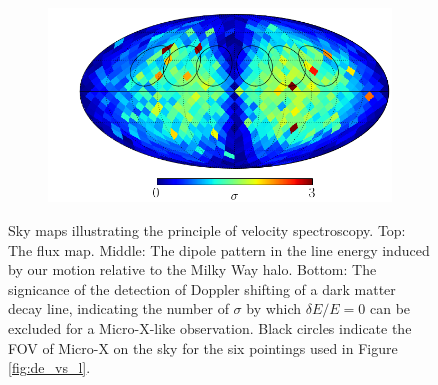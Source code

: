 \documentclass[aps,prd,10pt,twocolumn,superscriptaddress,showpacs]{revtex4-1}
\begin{document}
\begin{figure}[h!]
\begin{subfigure}[b]{1.0\columnwidth}
\end{subfigure}
\par\medskip
\begin{subfigure}[b]{1.0\columnwidth}
	\includegraphics[width=\textwidth]{sigma_map_374.png}
\end{subfigure}
\caption{Sky maps illustrating the principle of velocity spectroscopy. Top: The flux map. Middle:
	The dipole pattern in the line energy induced by our motion relative to the Milky Way halo.
	Bottom: The signicance of the detection of Doppler shifting of a dark matter decay line,
indicating the number of $\sigma$ by which $\delta E/E=0$ can be excluded for a Micro-X-like
observation. Black circles indicate the
FOV of Micro-X on the sky for the six pointings used in Figure \ref{fig:de_vs_l}. }
\label{fig:skymaps}
\end{figure}



\end{document}
